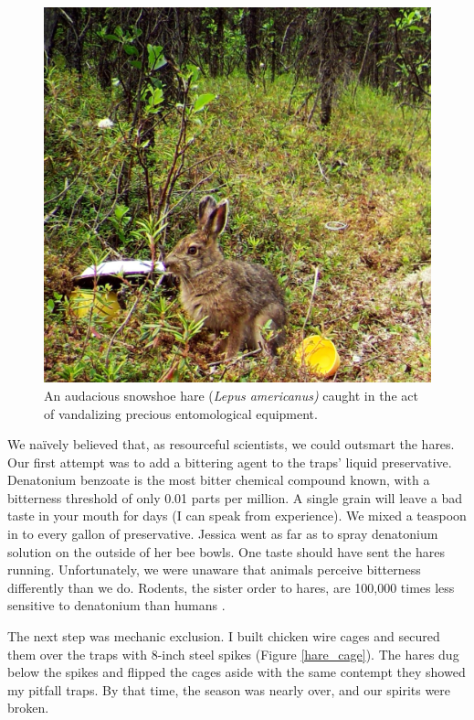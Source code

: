 \begin{figure}[H]
\begin{center}
\vspace{2mm}
\includegraphics[width=\textwidth]{img/hare.jpg}
\caption{An audacious snowshoe hare (\textit{Lepus americanus)} caught in the act of vandalizing precious entomological equipment.}
\label{hare}
\end{center}
\end{figure}  

We na\"{i}vely believed that, as resourceful scientists, we could outsmart the hares. Our first attempt was to add a bittering agent to the traps’ liquid preservative. Denatonium benzoate is the most bitter chemical compound known, with a bitterness threshold of only 0.01 parts per million. A single grain will leave a bad taste in your mouth for days (I can speak from experience). We mixed a teaspoon in to every gallon of preservative. Jessica went as far as to spray denatonium solution on the outside of her bee bowls. One taste should have sent the hares running. Unfortunately, we were unaware that animals perceive bitterness differently than we do. Rodents, the sister order to hares, are 100,000 times less sensitive to denatonium than humans \citep{Franketal2004}. 

The next step was mechanic exclusion. I built chicken wire cages and secured them over the traps with 8-inch steel spikes (Figure \ref{hare_cage}). The hares dug below the spikes and flipped the cages aside with the same contempt they showed my pitfall traps. By that time, the season was nearly over, and our spirits were broken.

